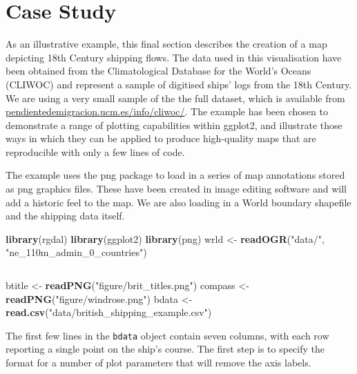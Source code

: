 \documentclass[]{article}
\newenvironment{Shaded}{}{}
\newcommand{\KeywordTok}[1]{\textcolor[rgb]{0.00,0.44,0.13}{\textbf{{#1}}}}
\newcommand{\StringTok}[1]{\textcolor[rgb]{0.25,0.44,0.63}{{#1}}}
\newcommand{\NormalTok}[1]{{#1}}
\begin{document}
\section{Case Study}
As an illustrative example, this final section describes the creation of a map depicting 18th Century shipping flows. The data used in this visualisation have been obtained from the Climatological Database for the World's Oceans (CLIWOC) and
represent a sample of digitised ships' logs from the 18th Century.
We are using a very small sample of the the full dataset, which is
available
from\\\href{http://pendientedemigracion.ucm.es/info/cliwoc/}{pendientedemigracion.ucm.es/info/cliwoc/}.
The example has been chosen to demonstrate a range of plotting capabilities
within ggplot2, and illustrate those ways in which they can be applied to produce
high-quality maps that are reproducible with only a few lines of code.

The example uses the png package to load in a series of map
annotations stored as png graphics files. These have been created in image editing software and will add a historic feel to the map. We are also loading in a World boundary
shapefile and the shipping data itself.

\begin{Shaded}
\begin{Highlighting}[]
\KeywordTok{library}\NormalTok{(rgdal)}
\KeywordTok{library}\NormalTok{(ggplot2)}
\KeywordTok{library}\NormalTok{(png)}
\NormalTok{wrld <- }\KeywordTok{readOGR}\NormalTok{(}\StringTok{"data/"}\NormalTok{, }\StringTok{"ne_110m_admin_0_countries"}\NormalTok{)}
\end{Highlighting}
\end{Shaded}
\begin{verbatim}

\end{verbatim}
\begin{Shaded}
\begin{Highlighting}[]
\NormalTok{btitle <- }\KeywordTok{readPNG}\NormalTok{(}\StringTok{"figure/brit_titles.png"}\NormalTok{)}
\NormalTok{compass <- }\KeywordTok{readPNG}\NormalTok{(}\StringTok{"figure/windrose.png"}\NormalTok{)}
\NormalTok{bdata <- }\KeywordTok{read.csv}\NormalTok{(}\StringTok{"data/british_shipping_example.csv"}\NormalTok{)}
\end{Highlighting}
\end{Shaded}

The first few lines in the \texttt{bdata} object contain seven columns, with each row reporting a single point on the
ship's course. The first step is to specify the format for a number of plot parameters that will remove the axis labels.
\end{document}
